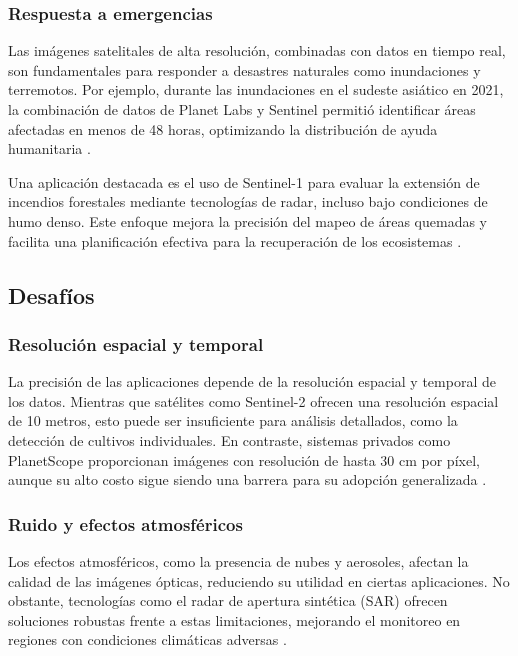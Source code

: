         \subsubsection{Respuesta a emergencias}
            Las imágenes satelitales de alta resolución, combinadas con datos en tiempo real, son fundamentales para responder a desastres naturales como inundaciones y terremotos. Por ejemplo, durante las inundaciones en el sudeste asiático en 2021, la combinación de datos de Planet Labs y Sentinel permitió identificar áreas afectadas en menos de 48 horas, optimizando la distribución de ayuda humanitaria \autocite{matgen2020feasibility}. 
            
            Una aplicación destacada es el uso de Sentinel-1 para evaluar la extensión de incendios forestales mediante tecnologías de radar, incluso bajo condiciones de humo denso. Este enfoque mejora la precisión del mapeo de áreas quemadas y facilita una planificación efectiva para la recuperación de los ecosistemas \autocite{ajmar2017response}. 
        
    \subsection{Desafíos}
        \subsubsection{Resolución espacial y temporal}
            La precisión de las aplicaciones depende de la resolución espacial y temporal de los datos. Mientras que satélites como Sentinel-2 ofrecen una resolución espacial de 10 metros, esto puede ser insuficiente para análisis detallados, como la detección de cultivos individuales. En contraste, sistemas privados como PlanetScope proporcionan imágenes con resolución de hasta 30 cm por píxel, aunque su alto costo sigue siendo una barrera para su adopción generalizada \autocite{schiavon2021monitoring}.
        
        \subsubsection{Ruido y efectos atmosféricos}
            Los efectos atmosféricos, como la presencia de nubes y aerosoles, afectan la calidad de las imágenes ópticas, reduciendo su utilidad en ciertas aplicaciones. No obstante, tecnologías como el radar de apertura sintética (SAR) ofrecen soluciones robustas frente a estas limitaciones, mejorando el monitoreo en regiones con condiciones climáticas adversas \autocite{caballero2019sentinel}.
        
